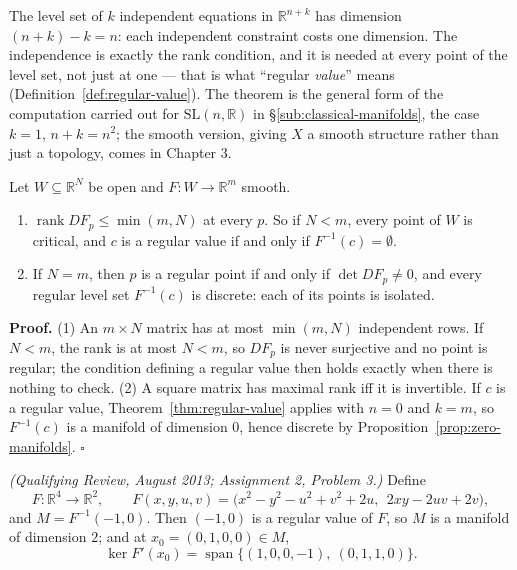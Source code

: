 \documentclass[11pt]{report}
\makeatletter
\newcounter{thmcounter}[section]
\newcounter{excounter}[section]
\renewenvironment{proof}[1][Proof]{\noindent\textbf{#1.} }{\hfill$\square$\par\vspace{5pt}}
\newcommand{\thmlabel}[1]{\edef\@currentlabel{\arabic{section}.\arabic{thmcounter}}\label{#1}}
\newcommand{\exlabel}[1]{\edef\@currentlabel{\arabic{section}.\arabic{excounter}}\label{#1}}
\newcommand{\SL}{\mathrm{SL}}
\makeatother
\begin{document}
\begin{rembox}\label{rem:reading-dimension}
The level set of $k$ independent equations in $\mathbb{R}^{n+k}$ has dimension $(n+k) - k = n$: each independent constraint costs one dimension. The independence is exactly the rank condition, and it is needed at every point of the level set, not just at one --- that is what ``regular \emph{value}'' means (Definition~\ref{def:regular-value}). The theorem is the general form of the computation carried out for $\SL(n,\mathbb{R})$ in \S\ref{sub:classical-manifolds}, the case $k = 1$, $n + k = n^2$; the smooth version, giving $X$ a smooth structure rather than just a topology, comes in Chapter 3.
\end{rembox}


\begin{propbox}\thmlabel{prop:regular-N-le-m}
Let $W \subseteq \mathbb{R}^N$ be open and $F : W \to \mathbb{R}^m$ smooth.
\begin{enumerate}
    \item $\operatorname{rank} DF_p \le \min(m, N)$ at every $p$. So if $N < m$, every point of $W$ is critical, and $c$ is a regular value if and only if $F^{-1}(c) = \emptyset$.
    \item If $N = m$, then $p$ is a regular point if and only if $\det DF_p \ne 0$, and every regular level set $F^{-1}(c)$ is discrete: each of its points is isolated.
\end{enumerate}
\end{propbox}

\begin{proof}
(1) An $m \times N$ matrix has at most $\min(m,N)$ independent rows. If $N < m$, the rank is at most $N < m$, so $DF_p$ is never surjective and no point is regular; the condition defining a regular value then holds exactly when there is nothing to check. (2) A square matrix has maximal rank iff it is invertible. If $c$ is a regular value, Theorem~\ref{thm:regular-value} applies with $n = 0$ and $k = m$, so $F^{-1}(c)$ is a manifold of dimension $0$, hence discrete by Proposition~\ref{prop:zero-manifolds}.
\end{proof}

\begin{exbox}\exlabel{ex:qr-level-set}
\textit{(Qualifying Review, August 2013; Assignment 2, Problem 3.)} Define
\[
F : \mathbb{R}^4 \to \mathbb{R}^2, \qquad F(x,y,u,v) = \big(x^2 - y^2 - u^2 + v^2 + 2u,\ \ 2xy - 2uv + 2v\big),
\]
and $M = F^{-1}(-1,0)$. Then $(-1,0)$ is a regular value of $F$, so $M$ is a manifold of dimension $2$; and at $x_0 = (0,1,0,0) \in M$,
\[
\ker F'(x_0) = \operatorname{span}\{(1,0,0,-1),\ (0,1,1,0)\}.
\]
\end{exbox}
\end{document}
